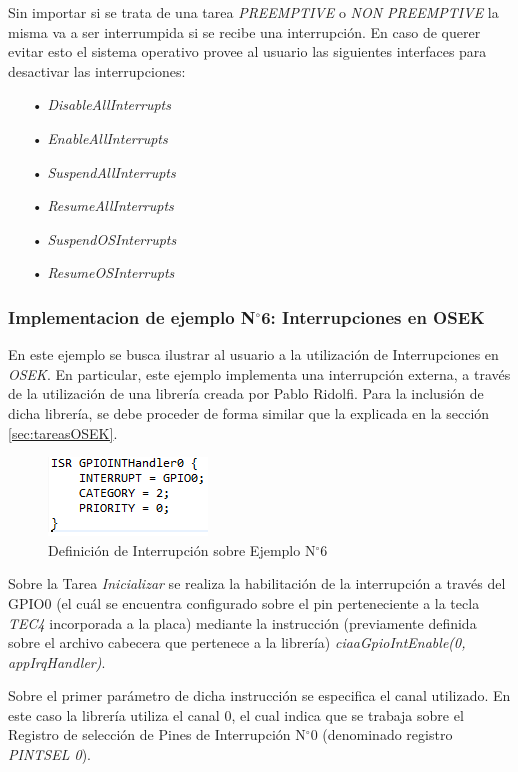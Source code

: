 \documentclass[12pt,letterpaper]{article}
\begin{document}
Sin importar si se trata de una tarea \textit{PREEMPTIVE} o \textit{NON PREEMPTIVE} la misma va a ser interrumpida si se recibe una interrupción. En caso de querer evitar esto el sistema operativo provee al usuario las siguientes
interfaces para desactivar las interrupciones:
\begin{enumerate}
\item[•]\textit{DisableAllInterrupts}
\item[•]\textit{EnableAllInterrupts}
\item[•]\textit{SuspendAllInterrupts}
\item[•]\textit{ResumeAllInterrupts}
\item[•]\textit{SuspendOSInterrupts}
\item[•]\textit{ResumeOSInterrupts}
\end{enumerate}

\subsubsection{Implementacion de ejemplo N$^{\circ}$6: Interrupciones en OSEK}
En este ejemplo se busca ilustrar al usuario a la utilización de Interrupciones en \textit{OSEK}. En particular, este ejemplo implementa una interrupción externa, a través de la utilización de una librería creada por Pablo Ridolfi\cite{enlacelibreriainterrupcion}. Para la inclusión de dicha librería, se debe proceder de forma similar que la explicada en la sección \ref{sec:tareasOSEK}.

\begin{figure}[!h]
\centering
\includegraphics[width=5 cm]{figuras/f34.png}
\caption{Definición de Interrupción sobre Ejemplo N$^{\circ}$6}
\label{Fig43}
\end{figure}
Sobre la Tarea \textit{Inicializar} se realiza la habilitación de la interrupción a través del GPIO0 (el cuál se encuentra configurado sobre el pin perteneciente a la tecla \textit{TEC4} incorporada a la placa) mediante la instrucción (previamente definida sobre el archivo cabecera que pertenece a la librería) \textit{ciaaGpioIntEnable(0, appIrqHandler)}.

Sobre el primer parámetro de dicha instrucción se especifica el canal utilizado. En este caso la librería utiliza el canal 0, el cual indica que se trabaja sobre el Registro de selección de Pines de Interrupción N$^{\circ}$0 (denominado registro \textit{PINTSEL 0}).
\end{document}
